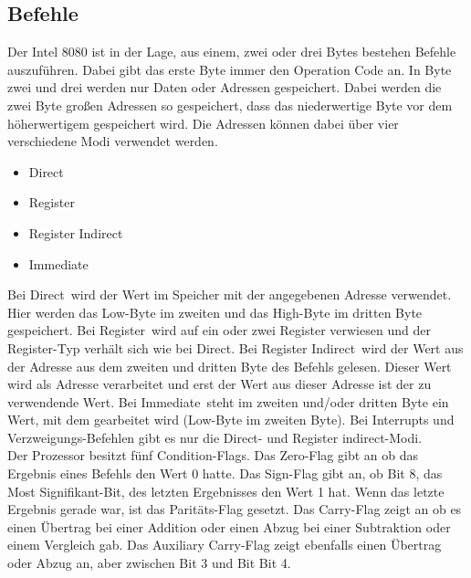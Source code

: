 \documentclass[12pt]{article}
\begin{document}
\subsection{Befehle}

Der Intel 8080 ist in der Lage, aus einem, zwei oder drei Bytes bestehen Befehle auszuführen. Dabei gibt das erste Byte immer den Operation Code an. In Byte zwei und drei werden nur Daten oder Adressen gespeichert. Dabei werden die zwei Byte großen Adressen so gespeichert, dass das niederwertige Byte vor dem höherwertigem gespeichert wird. Die Adressen können dabei über vier verschiedene Modi verwendet werden.

\begin{itemize}
\item Direct
\item Register
\item Register Indirect
\item Immediate
\end{itemize}

\noindent
Bei \glqq Direct\grqq\ wird der Wert im Speicher mit der angegebenen Adresse verwendet. Hier werden das Low-Byte im zweiten und das High-Byte im dritten Byte gespeichert. Bei \glqq Register\grqq\ wird auf ein oder zwei Register verwiesen und der Register-Typ verhält sich wie bei \glqq Direct\grqq. Bei \glqq Register Indirect\grqq\ wird der Wert aus der Adresse aus dem zweiten und dritten Byte des Befehls gelesen. Dieser Wert wird als Adresse verarbeitet und erst der Wert aus dieser Adresse ist der zu verwendende Wert. Bei \glqq Immediate\grqq\ steht
im zweiten und/oder dritten Byte ein Wert, mit dem gearbeitet wird (Low-Byte im zweiten Byte).
Bei Interrupts und Verzweigungs-Befehlen gibt es nur die \glqq Direct\grqq - und \glqq Register indirect\grqq -Modi. \cite{IntMan45}
\\ 

\noindent
Der Prozessor besitzt fünf Condition-Flags. Das Zero-Flag gibt an ob das Ergebnis eines Befehls den Wert 0 hatte. Das Sign-Flag gibt an, ob Bit 8, das Most Signifikant-Bit, des letzten Ergebnisses den Wert 1 hat. Wenn das letzte Ergebnis gerade war, ist das Paritäts-Flag gesetzt. Das Carry-Flag zeigt an ob es einen Übertrag bei einer Addition oder einen Abzug bei einer Subtraktion oder einem Vergleich gab. Das Auxiliary Carry-Flag zeigt ebenfalls einen Übertrag oder Abzug an, aber zwischen Bit 3 und Bit Bit 4. \cite{IntMan45}
\\
\end{document}
